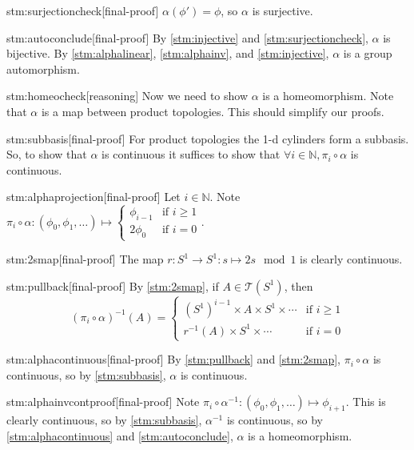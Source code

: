 \begin{stm}{stm:surjectioncheck}[final-proof]
$\alpha(\phi') = \phi$, so $\alpha$ is surjective.
\end{stm}

\begin{stm}{stm:autoconclude}[final-proof]
By \ref{stm:injective} and \ref{stm:surjectioncheck}, $\alpha$ is bijective. By \ref{stm:alphalinear}, \ref{stm:alphainv}, and \ref{stm:injective}, $\alpha$ is a group automorphism.
\end{stm} 

\begin{stm}{stm:homeocheck}[reasoning]
Now we need to show $\alpha$ is a homeomorphism. Note that $\alpha$ is a map between product topologies. This should simplify our proofs.
\end{stm}

\begin{stm}{stm:subbasis}[final-proof]
For product topologies the 1-d cylinders form a subbasis. So, to show that $\alpha$ is continuous it suffices to show that $\forall i \in \mathbb{N}, \pi_i \circ \alpha$ is continuous.
\end{stm}

\begin{stm}{stm:alphaprojection}[final-proof]
Let $i \in \mathbb{N}$. Note $\pi_i \circ \alpha : (\phi_0, \phi_1, \dots) \mapsto \begin{cases} \phi_{i-1} & \text{if } i \ge 1 \\ 2\phi_0 & \text{if } i = 0 \end{cases}$.
\end{stm}

\begin{stm}{stm:2smap}[final-proof]
The map $r : S^1 \to S^1 : s \mapsto 2s \mod 1$ is clearly continuous.
\end{stm}

\begin{stm}{stm:pullback}[final-proof]
By \ref{stm:2smap}, if $A \in \mathcal{T}(S^1)$, then 
\[
(\pi_i \circ \alpha)^{-1}(A) = 
\begin{cases}
(S^1)^{i-1} \times A \times S^1 \times \cdots & \text{if } i \ge 1 \\
r^{-1}(A) \times S^1 \times \cdots & \text{if } i = 0
\end{cases}
\]
\end{stm}

\begin{stm}{stm:alphacontinuous}[final-proof]
By \ref{stm:pullback} and \ref{stm:2smap}, $\pi_i \circ \alpha$ is continuous, so by \ref{stm:subbasis}, $\alpha$ is continuous.
\end{stm}

\begin{stm}{stm:alphainvcontproof}[final-proof]
Note $\pi_i \circ \alpha^{-1} : (\phi_0, \phi_1, \dots) \mapsto \phi_{i+1}$. This is clearly continuous, so by \ref{stm:subbasis}, $\alpha^{-1}$ is continuous, so by \ref{stm:alphacontinuous} and \ref{stm:autoconclude}, $\alpha$ is a homeomorphism.
\end{stm}
